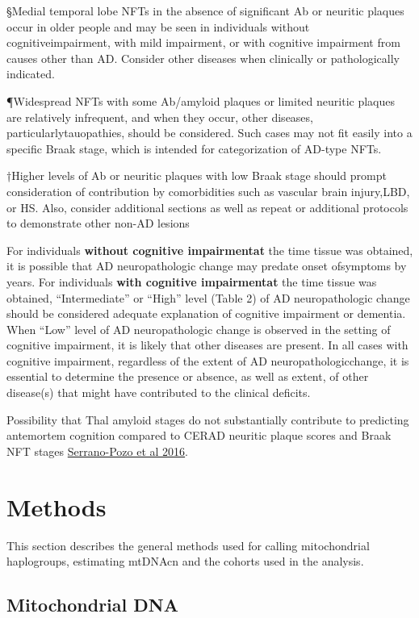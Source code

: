 \documentclass[]{book}
\begin{document}
§Medial temporal lobe NFTs in the absence of significant Ab or neuritic plaques occur in older people and may be seen in individuals without cognitiveimpairment, with mild impairment, or with cognitive impairment from causes other than AD. Consider other diseases when clinically or pathologically indicated.

¶Widespread NFTs with some Ab/amyloid plaques or limited neuritic plaques are relatively infrequent, and when they occur, other diseases, particularlytauopathies, should be considered. Such cases may not fit easily into a specific Braak stage, which is intended for categorization of AD-type NFTs.

†Higher levels of Ab or neuritic plaques with low Braak stage should prompt consideration of contribution by comorbidities such as vascular brain injury,LBD, or HS. Also, consider additional sections as well as repeat or additional protocols to demonstrate other non-AD lesions

For individuals \textbf{without cognitive impairmentat} the time tissue was obtained, it is possible that AD neuropathologic change may predate onset ofsymptoms by years. For individuals \textbf{with cognitive impairmentat} the time tissue was obtained, ``Intermediate'' or ``High'' level (Table 2) of AD neuropathologic change should be considered adequate explanation of cognitive impairment or dementia. When ``Low'' level of AD neuropathologic change is observed in the setting of cognitive impairment, it is likely that other diseases are present. In all cases with cognitive impairment, regardless of the extent of AD neuropathologicchange, it is essential to determine the presence or absence, as well as extent, of other disease(s) that might have contributed to the clinical deficits.

Possibility that Thal amyloid stages do not substantially contribute to predicting antemortem cognition compared to CERAD neuritic plaque scores and Braak NFT stages \href{https://doi.org/10.1093/jnen/nlw026}{Serrano-Pozo et al 2016}.

\hypertarget{methods}{%
\chapter{Methods}\label{methods}}

This section describes the general methods used for calling mitochondrial haplogroups, estimating mtDNAcn and the cohorts used in the analysis.

\hypertarget{mitochondrial-dna}{%
\section{Mitochondrial DNA}\label{mitochondrial-dna}}
\end{document}
